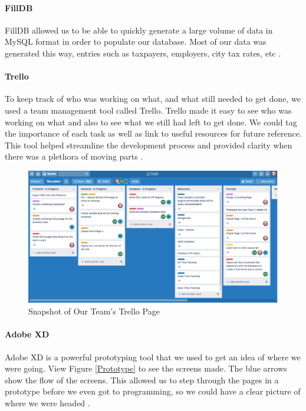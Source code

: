 \documentclass[sigconf]{acmart}
\begin{document}
\paragraph{FillDB}
FillDB allowed us to be able to quickly generate a large volume of data in MySQL format in order to populate our database. Most of our data was generated this way, entries such as taxpayers, employers, city tax rates, etc \cite{FillDB}.

\paragraph{Trello}
To keep track of who was working on what, and what still needed to get done, we used a team management tool called Trello. Trello made it easy to see who was working on what and also to see what we still had left to get done. We could tag the importance of each task as well as link to useful resources for future reference. This tool helped streamline the development process and provided clarity when there was a plethora of moving parts \cite{Trello}.

\begin{figure}[H]
  \label{Trello}
  \centering
  \includegraphics[width=\linewidth]{Images/TrelloBoard.png}
  \caption{Snapshot of Our Team’s Trello Page}
\end{figure}

\paragraph{Adobe XD}
Adobe XD is a powerful prototyping tool that we used to get an idea of where we were going. View Figure \ref{Prototype} to see the screens made. The blue arrows show the flow of the screens. This allowed us to step through the pages in a prototype before we even got to programming, so we could have a clear picture of where we were headed \cite{AdobeXD}.
\end{document}

